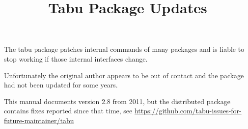\documentclass[a4paper]{article}
\begin{document}
\title{Tabu Package Updates}
\maketitle

The tabu package patches internal commands of many packages and is
liable to stop working if those internal interfaces change. 

Unfortunately the original author appears to be out of contact and the
package had not been updated for some years.

This manual documents version 2.8 from 2011, but the distributed
package contains fixes reported since that time, see
\url{https://github.com/tabu-issues-for-future-maintainer/tabu}
\end{document}
